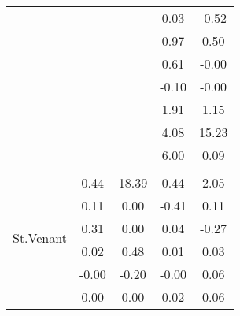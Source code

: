 \begin{table}
\begin{tabular}{c|cc|cc|}
\multicolumn{1}{|c|}{} & \multicolumn{1}{|c|}{} & \multicolumn{1}{|c|}{} & \multicolumn{1}{|c|}{      0.03} & \multicolumn{1}{|c|}{     -0.52} \\ 
\multicolumn{1}{|c|}{} & \multicolumn{1}{|c|}{} & \multicolumn{1}{|c|}{} & \multicolumn{1}{|c|}{      0.97} & \multicolumn{1}{|c|}{      0.50} \\ 
\multicolumn{1}{|c|}{} & \multicolumn{1}{|c|}{} & \multicolumn{1}{|c|}{} & \multicolumn{1}{|c|}{      0.61} & \multicolumn{1}{|c|}{     -0.00} \\ 
\multicolumn{1}{|c|}{} & \multicolumn{1}{|c|}{} & \multicolumn{1}{|c|}{} & \multicolumn{1}{|c|}{     -0.10} & \multicolumn{1}{|c|}{     -0.00} \\ 
\multicolumn{1}{|c|}{} & \multicolumn{1}{|c|}{} & \multicolumn{1}{|c|}{} & \multicolumn{1}{|c|}{      1.91} & \multicolumn{1}{|c|}{      1.15} \\ 
\multicolumn{1}{|c|}{} & \multicolumn{1}{|c|}{} & \multicolumn{1}{|c|}{} & \multicolumn{1}{|c|}{      4.08} & \multicolumn{1}{|c|}{     15.23} \\ 
\multicolumn{1}{|c|}{} & \multicolumn{1}{|c|}{} & \multicolumn{1}{|c|}{} & \multicolumn{1}{|c|}{      6.00} & \multicolumn{1}{|c|}{      0.09} \\ 
\hline 
\multicolumn{1}{|c|}{\multirow{100}{*}{St.Venant}} &\multicolumn{1}{|c|}{} & \multicolumn{1}{|c|}{} & \multicolumn{1}{|c|}{} & \multicolumn{1}{|c|}{} \\ 
\multicolumn{1}{|c|}{} & \multicolumn{1}{|c|}{      0.44} & \multicolumn{1}{|c|}{     18.39} & \multicolumn{1}{|c|}{      0.44} & \multicolumn{1}{|c|}{      2.05} \\ 
\multicolumn{1}{|c|}{} & \multicolumn{1}{|c|}{      0.11} & \multicolumn{1}{|c|}{      0.00} & \multicolumn{1}{|c|}{     -0.41} & \multicolumn{1}{|c|}{      0.11} \\ 
\multicolumn{1}{|c|}{} & \multicolumn{1}{|c|}{      0.31} & \multicolumn{1}{|c|}{      0.00} & \multicolumn{1}{|c|}{      0.04} & \multicolumn{1}{|c|}{     -0.27} \\ 
\multicolumn{1}{|c|}{} & \multicolumn{1}{|c|}{      0.02} & \multicolumn{1}{|c|}{      0.48} & \multicolumn{1}{|c|}{      0.01} & \multicolumn{1}{|c|}{      0.03} \\ 
\multicolumn{1}{|c|}{} & \multicolumn{1}{|c|}{     -0.00} & \multicolumn{1}{|c|}{     -0.20} & \multicolumn{1}{|c|}{     -0.00} & \multicolumn{1}{|c|}{      0.06} \\ 
\multicolumn{1}{|c|}{} & \multicolumn{1}{|c|}{      0.00} & \multicolumn{1}{|c|}{      0.00} & \multicolumn{1}{|c|}{      0.02} & \multicolumn{1}{|c|}{      0.06} \\ 

\end{tabular}
\end{table}
